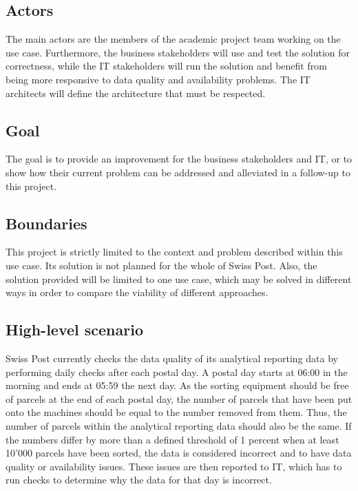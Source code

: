 \subsection*{Actors}
The main actors are the members of the academic project team working on the use case. Furthermore, the business stakeholders will use and test the solution for correctness, while the IT stakeholders will run the solution and benefit from being more responsive to data quality and availability problems. The IT architects will define the architecture that must be respected.

\subsection*{Goal}
The goal is to provide an improvement for the business stakeholders and IT, or to show how their current problem can be addressed and alleviated in a follow-up to this project.

\subsection*{Boundaries}
This project is strictly limited to the context and problem described within this use case. Its solution is not planned for the whole of Swiss Post. Also, the solution provided will be limited to one use case, which may be solved in different ways in order to compare the viability of different approaches.

\subsection*{High-level scenario}
Swiss Post currently checks the data quality of its analytical reporting data by performing daily checks after each postal day. A postal day starts at 06:00 in the morning and ends at 05:59 the next day. As the sorting equipment should be free of parcels at the end of each postal day, the number of parcels that have been put onto the machines should be equal to the number removed from them. Thus, the number of parcels within the analytical reporting data should also be the same. If the numbers differ by more than a defined threshold of 1 percent when at least 10'000 parcels have been sorted, the data is considered incorrect and to have data quality or availability issues. These issues are then reported to IT, which has to run checks to determine why the data for that day is incorrect.
